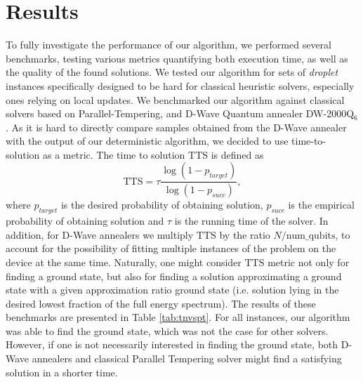 \section{Results}

To fully investigate the performance of our algorithm, we performed several
benchmarks, testing various metrics quantifying both execution time, as well as
the quality of the found solutions. We tested our algorithm for sets of
\emph{droplet} instances specifically designed to be hard for classical
heuristic solvers, especially ones relying on local updates. We benchmarked our
algorithm against classical solvers based on Parallel-Tempering, and D-Wave
Quantum annealer DW-2000Q$_6$. As it is hard to directly compare samples
obtained from the D-Wave annealer with the output of our deterministic
algorithm, we decided to use time-to-solution as a metric. The time to solution
$\mbox{TTS}$ is defined as
    \begin{equation}
      \label{eq:tts}
      \mbox{TTS} = \tau \frac{\log(1 - p_{target})}{\log(1 - p_{succ})},
    \end{equation}
    where $p_{target}$ is the desired probability of obtaining solution, $p_{succ}$
    is the empirical probability of obtaining solution and $\tau$ is the running
    time of the solver. In addition, for D-Wave annealers we multiply $\mbox{TTS}$
    by the ratio $N/\mbox{num\_qubits}$, to account for the possibility of fitting
    multiple instances of the problem on the device at the same time. Naturally,
    one might consider $\mbox{TTS}$ metric not only for finding a ground state, but
also for finding a solution approximating a ground state with a given
approximation ratio ground state (i.e. solution lying in the desired lowest
fraction of the full energy spectrum). The results of these benchmarks are
presented in Table \ref{tab:tnvspt}. For all instances, our algorithm was able
to find the ground state, which was not the case for other solvers. However, if
one is not necessarily interested in finding the ground state, both D-Wave
annealers and classical Parallel Tempering solver might find a satisfying
solution in a shorter time.
